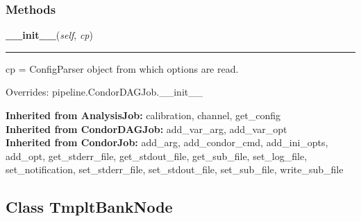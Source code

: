 
  \subsubsection{Methods}

    \label{inspiral:TmpltBankJob:__init__}
    \vspace{0.5ex}

    \noindent\begin{boxedminipage}{\textwidth}

    \raggedright \textbf{\_\_init\_\_}(\textit{self}, \textit{cp})

    \vspace{-1.5ex}

    \rule{\textwidth}{0.5\fboxrule}
    cp = ConfigParser object from which options are read.

    \vspace{1ex}

      Overrides: pipeline.CondorDAGJob.\_\_init\_\_

    \end{boxedminipage}

  \noindent\textbf{Inherited from AnalysisJob:}
    calibration,
    channel,
    get\_config
    \\
  \noindent\textbf{Inherited from CondorDAGJob:}
    add\_var\_arg,
    add\_var\_opt
    \\
  \noindent\textbf{Inherited from CondorJob:}
    add\_arg,
    add\_condor\_cmd,
    add\_ini\_opts,
    add\_opt,
    get\_stderr\_file,
    get\_stdout\_file,
    get\_sub\_file,
    set\_log\_file,
    set\_notification,
    set\_stderr\_file,
    set\_stdout\_file,
    set\_sub\_file,
    write\_sub\_file


\subsection{Class TmpltBankNode}

